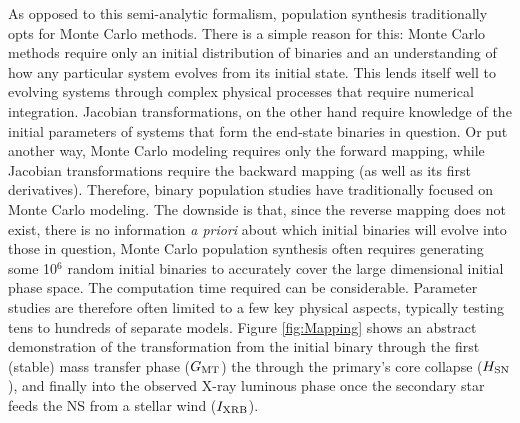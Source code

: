 \documentclass[12pt, preprint]{aastex}
\begin{document}
As opposed to this semi-analytic formalism, population synthesis traditionally opts for Monte Carlo methods. There is a simple reason for this: Monte Carlo methods require only an initial distribution of binaries and an understanding of how any particular system evolves from its initial state. This lends itself well to evolving systems through complex physical processes that require numerical integration. Jacobian transformations, on the other hand require knowledge of the initial parameters of systems that form the end-state binaries in question. Or put another way, Monte Carlo modeling requires only the forward mapping, while Jacobian transformations require the backward mapping (as well as its first derivatives). Therefore, binary population studies have traditionally focused on Monte Carlo modeling. The downside is that, since the reverse mapping does not exist, there is no information {\it a priori} about which initial binaries will evolve into those in question, Monte Carlo population synthesis often requires generating some 10$^6$ random initial binaries to accurately cover the large dimensional initial phase space.
The computation time required can be considerable. Parameter studies are therefore often limited to a few key physical aspects, typically testing tens to hundreds of separate models. Figure \ref{fig:Mapping} shows an abstract demonstration of the transformation from the initial binary through the first (stable) mass transfer phase ($G_{\rm MT}$) the through the primary's core collapse ($H_{\rm SN}$), and finally into the observed X-ray luminous phase once the secondary star feeds the NS from a stellar wind ($I_{\rm XRB}$).
\end{document}
